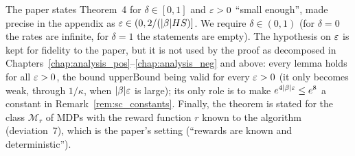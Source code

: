 \begin{remark}\label{rem:sc_hypotheses}
The paper states Theorem~4 for $\delta \in [0,1]$ and $\varepsilon > 0$ ``small enough'', made precise
in the appendix as $\varepsilon \in (0, 2/(|\beta|HS)]$. We require $\delta \in (0,1)$ (for $\delta = 0$
the rates are infinite, for $\delta = 1$ the statements are empty). The hypothesis on $\varepsilon$ is
kept for fidelity to the paper, but it is not used by the proof as decomposed in
Chapters~\ref{chap:analysis_pos}--\ref{chap:analysis_neg} and above: every lemma holds for all
$\varepsilon > 0$, the bound $\mathrm{upperBound}$ being valid for every $\varepsilon > 0$ (it only becomes
weak, through $1/\kappa$, when $|\beta|\varepsilon$ is large); its only role is to make
$e^{4|\beta|\varepsilon} \le e^8$ a constant in Remark~\ref{rem:sc_constants}. Finally, the theorem
is stated for the class $\mathcal M_r$ of MDPs with the reward function $r$ known to the
algorithm (deviation~7), which is the paper's setting (``rewards are known and
deterministic'').
\end{remark}
